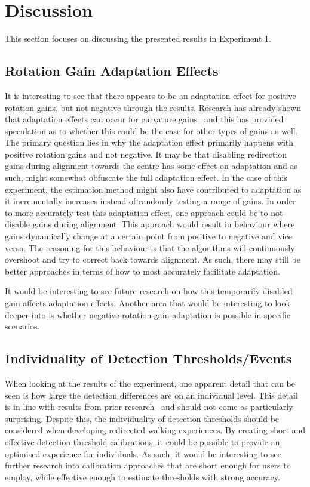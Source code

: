 \section{Discussion}\label{sec:ex1discussion}
This section focuses on discussing the presented results in Experiment 1.

\subsection{Rotation Gain Adaptation Effects}
It is interesting to see that there appears to be an adaptation effect for positive rotation gains, but not negative through the results. Research has already shown that adaptation effects can occur for curvature gains~\cite{bolling2019shrinking} and this has provided speculation as to whether this could be the case for other types of gains as well. The primary question lies in why the adaptation effect primarily happens with positive rotation gains and not negative. It may be that disabling redirection gains during alignment towards the centre has some effect on adaptation and as such, might somewhat obfuscate the full adaptation effect. In the case of this experiment, the estimation method might also have contributed to adaptation as it incrementally increases instead of randomly testing a range of gains. In order to more accurately test this adaptation effect, one approach could be to not disable gains during alignment. This approach would result in behaviour where gains dynamically change at a certain point from positive to negative and vice versa. The reasoning for this behaviour is that the algorithms will continuously overshoot and try to correct back towards alignment. As such, there may still be better approaches in terms of how to most accurately facilitate adaptation. 

It would be interesting to see future research on how this temporarily disabled gain affects adaptation effects. Another area that would be interesting to look deeper into is whether negative rotation gain adaptation is possible in specific scenarios. 

\subsection{Individuality of Detection Thresholds/Events}
When looking at the results of the experiment, one apparent detail that can be seen is how large the detection differences are on an individual level. This detail is in line with results from prior research~\cite{8446225, nguyen2018individual, schmitz2018you, fuglestad2018redirected} and should not come as particularly surprising. Despite this, the individuality of detection thresholds should be considered when developing redirected walking experiences. By creating short and effective detection threshold calibrations, it could be possible to provide an optimised experience for individuals. As such, it would be interesting to see further research into calibration approaches that are short enough for users to employ, while effective enough to estimate thresholds with strong accuracy. 


